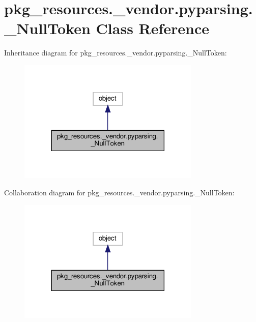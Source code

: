 \hypertarget{classpkg__resources_1_1__vendor_1_1pyparsing_1_1__NullToken}{}\section{pkg\+\_\+resources.\+\_\+vendor.\+pyparsing.\+\_\+\+Null\+Token Class Reference}
\label{classpkg__resources_1_1__vendor_1_1pyparsing_1_1__NullToken}


Inheritance diagram for pkg\+\_\+resources.\+\_\+vendor.\+pyparsing.\+\_\+\+Null\+Token\+:
\nopagebreak
\begin{figure}[H]
\begin{center}
\leavevmode
\includegraphics[width=246pt]{classpkg__resources_1_1__vendor_1_1pyparsing_1_1__NullToken__inherit__graph}
\end{center}
\end{figure}


Collaboration diagram for pkg\+\_\+resources.\+\_\+vendor.\+pyparsing.\+\_\+\+Null\+Token\+:
\nopagebreak
\begin{figure}[H]
\begin{center}
\leavevmode
\includegraphics[width=246pt]{classpkg__resources_1_1__vendor_1_1pyparsing_1_1__NullToken__coll__graph}
\end{center}
\end{figure}
